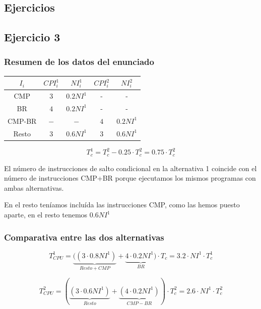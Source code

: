 \documentclass[10pt,a4paper,spanish]{report}
\begin{document}
\textcolor[rgb]{0.2,0.4,0.8}{\section{Ejercicios}}
\textcolor[rgb]{0.2,0.4,0.8}{\subsection{Ejercicio 3}}
\textcolor[rgb]{0.2,0.4,0.8}{\subsubsection{Resumen de los datos del enunciado}}
\begin{tabular}{c||c|c||c|c}
$I_i$ & $CPI_i^1$ & $NI_i^1$ & $CPI_i^2$ & $NI_i^2$ \\
\hline
CMP & $3$ & $0.2NI^1$ & - & - \\
BR & $4$ & $0.2NI^1$ & - & - \\
CMP-BR & $-$ & $-$ & $4$ & $0.2NI^1$ \\
Resto & $3$ & $0.6NI^1$ & $3$ & $0.6NI^1$
\end{tabular}

\begin{displaymath}
T_c^1 = T_c^2 - 0.25 \cdot T_c^2 = 0.75 \cdot T_c^2
\end{displaymath}

El número de instrucciones de salto condicional en la alternativa 1 coincide con el número de instrucciones CMP+BR porque ejecutamos los mismos programas con ambas alternativas.

En el resto teníamos incluída las instrucciones CMP, como las hemos puesto aparte, en el resto tenemos $0.6NI^1$

\textcolor[rgb]{0.2,0.4,0.8}{\subsubsection{Comparativa entre las dos alternativas}}
\begin{displaymath}
T_{CPU}^1 = \underbrace{((3 \cdot 0.8NI^1)}_{Resto+CMP} + \underbrace{4 \cdot 0.2NI^1)}_{BR} \cdot T_c = 3.2 \cdot NI^1 \cdot T_c^1
\end{displaymath}


\begin{displaymath}
T_{CPU}^2 = (\underbrace{(3 \cdot 0.6NI^1)}_{Resto} + \underbrace{(4 \cdot 0.2NI^1)}_{CMP-BR}) \cdot T_c^2 = 2.6 \cdot NI^1 \cdot T_c^2 
\end{displaymath}
\end{document}
